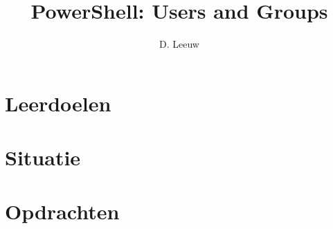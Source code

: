 \documentclass[a4paper,12pt,twoside,titlepage]{article}
\author{D. Leeuw}
\title{PowerShell: Users and Groups}
\date{\today\\
0.0.0
\vfill
\raggedright
\copyright\ 2025-2026 Dennis Leeuw\\
}
\begin{document}

\maketitle



\section{Leerdoelen}


\section{Situatie}


\section{Opdrachten}


\printindex
\end{document}
